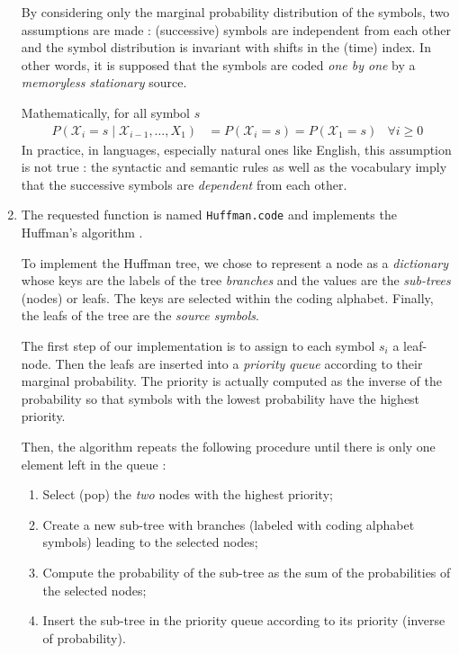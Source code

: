 \documentclass[a4paper, 12pt]{article}
\def\X{\mathcal{X}}
\begin{document}
\begin{enumerate}[leftmargin=*]
        By considering only the marginal probability distribution of the symbols, two assumptions are made : (successive) symbols are independent from each other and the symbol distribution is invariant with shifts in the (time) index. In other words, it is supposed that the symbols are coded \emph{one by one} by a \emph{memoryless} \emph{stationary} source.
        
        Mathematically, for all symbol $s$
        \begin{align*}
            P(\X_{i} = s \mid \X_{i - 1}, \ldots, X_{1}) & = P(\X_{i} = s) = P(\X_1 = s) & \forall i \geq 0
        \end{align*}
        In practice, in languages, especially natural ones like English, this assumption is not true : the syntactic and semantic rules as well as the vocabulary imply that the successive symbols are \emph{dependent} from each other.
        
        
        \item The requested function is named \texttt{Huffman.code} and implements the Huffman's algorithm \cite{huffman1952method}.
        
        To implement the Huffman tree, we chose to represent a node as a \emph{dictionary} whose keys are the labels of the tree \emph{branches} and the values are the \emph{sub-trees} (nodes) or leafs. The keys are selected within the coding alphabet. Finally, the leafs of the tree are the \emph{source symbols}.
        
        The first step of our implementation is to assign to each symbol $s_i$ a leaf-node. Then the leafs are inserted into a \emph{priority queue} according to their marginal probability. The priority is actually computed as the inverse of the probability so that symbols with the lowest probability have the highest priority.
        
        Then, the algorithm repeats the following procedure until there is only one element left in the queue :
        \begin{enumerate}[noitemsep, label=\roman*.]
            \item Select (pop) the \emph{two} nodes with the highest priority;
            \item Create a new sub-tree with branches (labeled with coding alphabet symbols) leading to the selected nodes;
            \item Compute the probability of the sub-tree as the sum of the probabilities of the selected nodes;
            \item Insert the sub-tree in the priority queue according to its priority (inverse of probability).
        \end{enumerate}
        

\end{enumerate}
\end{document}
